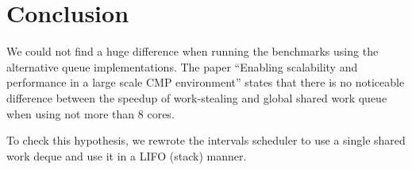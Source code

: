 
\chapter{Conclusion}
\label{chap:queues-conclusion}


We could not find a huge difference when running the benchmarks using
the alternative queue implementations. The paper ``Enabling
scalability and performance in a large scale CMP environment''
\cite{Saha2007} states that there is no noticeable difference between
the speedup of work-stealing and global shared work queue when using
not more than 8 cores.

To check this hypothesis, we rewrote the intervals scheduler to use a
single shared work deque and use it in a LIFO (stack) manner.



